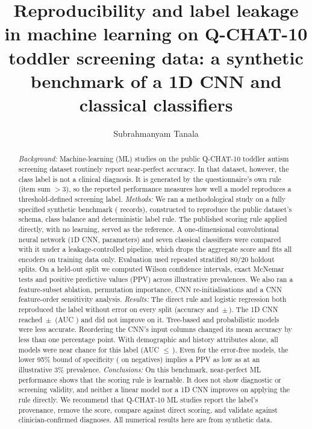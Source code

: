 \documentclass[5p,times,twocolumn]{elsarticle}
\begin{document}
\begin{frontmatter}

\title{Reproducibility and label leakage in machine learning on Q-CHAT-10 toddler screening data: a synthetic benchmark of a 1D CNN and classical classifiers}

\author[anits]{Subrahmanyam Tanala}
\address[anits]{Department of Electrical and Electronics Engineering, Anil Neerukonda Institute of Technology and Sciences (ANITS), Visakhapatnam, Andhra Pradesh, India}

\begin{abstract}
\textit{Background:} Machine-learning (ML) studies on the public Q-CHAT-10 toddler autism screening dataset routinely report near-perfect accuracy. In that dataset, however, the class label is not a clinical diagnosis. It is generated by the questionnaire's own rule (item sum $>3$), so the reported performance measures how well a model reproduces a threshold-defined screening label.
\textit{Methods:} We ran a methodological study on a fully specified synthetic benchmark (\NRecords{} records), constructed to reproduce the public dataset's schema, class balance and deterministic label rule. The published scoring rule applied directly, with no learning, served as the reference. A one-dimensional convolutional neural network (1D CNN, \CNNParams{} parameters) and seven classical classifiers were compared with it under a leakage-controlled pipeline, which drops the aggregate score and fits all encoders on training data only. Evaluation used \NSplits{} repeated stratified 80/20 holdout splits. On a held-out split we computed Wilson confidence intervals, exact McNemar tests and positive predictive values (PPV) across illustrative prevalences. We also ran a feature-subset ablation, permutation importance, \NInits{} CNN re-initialisations and a CNN feature-order sensitivity analysis.
\textit{Results:} The direct rule and logistic regression both reproduced the label without error on every split (accuracy \RuleAcc{} and \LRAcc{}\,$\pm$\,\LRAccStd{}). The 1D CNN reached \CNNAcc{}\,$\pm$\,\CNNAccStd{} (AUC \CNNAUC{}) and did not improve on it. Tree-based and probabilistic models were less accurate. Reordering the CNN's input columns changed its mean accuracy by less than one percentage point. With demographic and history attributes alone, all models were near chance for this label (AUC $\le$\,\DemoMaxAUC{}). Even for the error-free models, the lower 95\% bound of specificity (\LRSpecLo{} on \NTestNeg{} negatives) implies a PPV as low as \LRPPVpopLo{} at an illustrative 3\% prevalence.
\textit{Conclusions:} On this benchmark, near-perfect ML performance shows that the scoring rule is learnable. It does not show diagnostic or screening validity, and neither a linear model nor a 1D CNN improves on applying the rule directly. We recommend that Q-CHAT-10 ML studies report the label's provenance, remove the score, compare against direct scoring, and validate against clinician-confirmed diagnoses. All numerical results here are from synthetic data.
\end{abstract}


\end{frontmatter}
\end{document}
